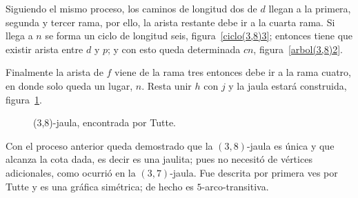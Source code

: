 \documentclass[11pt]{book}
\theoremstyle{definition}
\begin{document}
Siguiendo el mismo proceso, los caminos de longitud dos de $d$ llegan
a la primera, segunda y tercer rama, por ello, la arista restante debe
ir a la cuarta rama. Si llega a $n$ se forma un ciclo de longitud
seis, figura~\ref{ciclo(3,8)3}; entonces tiene que existir arista
entre $d$ y $p$; y con esto queda determinada $cn$,
figura~\ref{arbol(3,8)2}.

Finalmente la arista de $f$ viene de la rama tres entonces debe ir a
la rama cuatro, en donde solo queda un lugar, $n$. Resta unir $h$ con
$j$ y la jaula estará construida, figura~\ref{jaula(3,8)}.



\begin{figure}
  \centering
  \caption{(3,8)-jaula, encontrada por Tutte.} \label{jaula(3,8)}
\end{figure}




Con el proceso anterior queda demostrado que la $(3,8)$-jaula es única
y que alcanza la cota dada, es decir es una jaulita; pues no necesitó
de vértices adicionales, como ocurrió en la $(3,7)$-jaula. Fue
descrita por primera ves por Tutte y es una gráfica simétrica; de
hecho es $5$-arco-transitiva.
\end{document}
